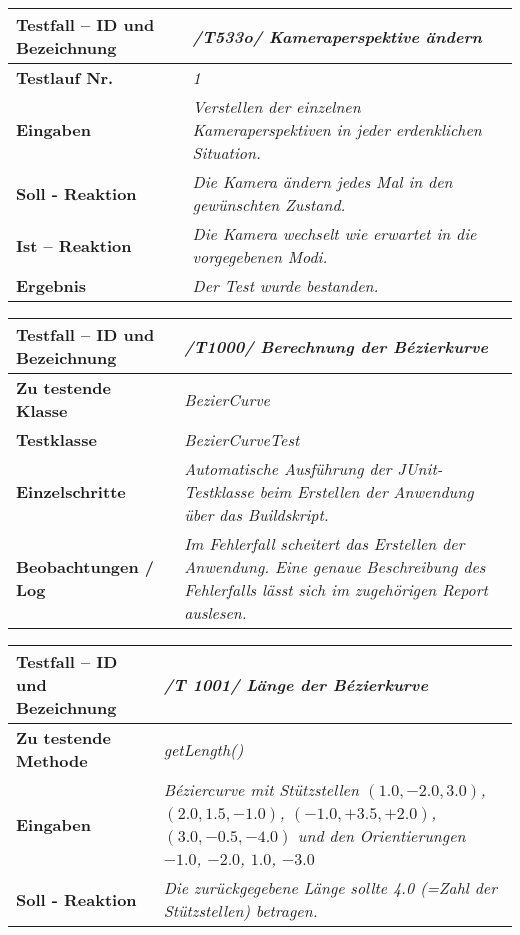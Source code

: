 \begin{longtable}{|p{7cm}|p{10cm}|}
\hline
\textbf{Testfall -- ID und Bezeichnung} & \textit{/T533o/ Kameraperspektive ändern} \\
\hline
\textbf{Testlauf Nr.} & \textit{1} \\
\hline
\textbf{Eingaben} & \textit{Verstellen der einzelnen Kameraperspektiven in jeder erdenklichen Situation.} \\
\hline
\textbf{Soll - Reaktion} & \textit{Die Kamera ändern jedes Mal in den gewünschten Zustand.} \\
\hline
\textbf{Ist -- Reaktion} & \textit{Die Kamera wechselt wie erwartet in die vorgegebenen Modi.} \\
\hline
\textbf{Ergebnis} & \textit{Der Test wurde bestanden.} \\
\hline
\end{longtable}





\begin{longtable}{|p{7cm}|p{10cm}|}
\hline
\textbf{Testfall -- ID und Bezeichnung} &  \textit{/T1000/ Berechnung der Bézierkurve} \\
\hline
\textbf{Zu testende Klasse} &  \textit{BezierCurve} \\
\hline
\textbf{Testklasse} &  \textit{BezierCurveTest} \\
\hline
\textbf{Einzelschritte} &  \textit{Automatische Ausführung der JUnit-Testklasse beim Erstellen
der Anwendung über das Buildskript.} \\
\hline
\textbf{Beobachtungen / Log} &  \textit{Im Fehlerfall scheitert das Erstellen der Anwendung.
Eine genaue Beschreibung des Fehlerfalls lässt sich im zugehörigen Report auslesen.} \\
\hline

\end{longtable}

\begin{longtable}{|p{7cm}|p{10cm}|}
\hline
\textbf{Testfall -- ID und Bezeichnung} & \textit{ /T 1001/ Länge der Bézierkurve} \\
\hline
\textbf{Zu testende Methode} &  \textit{getLength()} \\
\hline
\textbf{Eingaben} & \textit{Béziercurve mit Stützstellen $(1.0, -2.0, 3.0)$,
$(2.0, 1.5, -1.0)$, $(-1.0, +3.5, +2.0)$, $(3.0, -0.5, -4.0)$ und
den Orientierungen $-1.0$, $-2.0$, $1.0$, $-3.0$ }\\
\hline
\textbf{Soll - Reaktion} & \textit{Die zurückgegebene Länge sollte 4.0 (=Zahl der Stützstellen)
betragen.} \\
\hline
\end{longtable}

